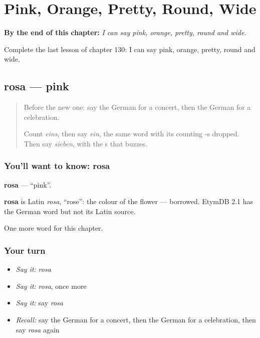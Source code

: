 
\chapter{Pink, Orange, Pretty, Round, Wide}
\label{ch:ge-pink-orange-pretty-round-wide}

\begin{chapteropening}
\textbf{By the end of this chapter:} \emph{I can say pink, orange, pretty, round and wide.}

Complete the last lesson of chapter 130: I can say pink, orange, pretty, round and wide.
\end{chapteropening}

\section[rosa]{rosa — pink}

\label{lesson:GE-C130-rosa}



\begin{quote}
Before the new one: say the German for a concert, then the German for a celebration.

Count \emph{eins}, then say \emph{ein}, the same word with its counting -s dropped. Then say \emph{sieben}, with the s that buzzes.
\end{quote}

\subsection*{You'll want to know: rosa}
\textbf{rosa} — \textquotedblleft{}pink\textquotedblright{}.

\begin{cousinweb}
\textbf{rosa} is Latin \emph{rosa}, \textquotedblleft{}rose\textquotedblright{}: the colour of the flower — borrowed. EtymDB 2.1 has the German word but not its Latin source.
\end{cousinweb}

\begin{grammarlens}[title={What you've built}]
One more word for this chapter.
\end{grammarlens}

\subsection*{Your turn}
\begin{itemize}
\raggedright
  \item \emph{Say it:} \emph{rosa}
  \item \emph{Say it:} \emph{rosa}, once more
  \item \emph{Say it:} say \emph{rosa}
  \item \emph{Recall:} say the German for a concert, then the German for a celebration, then say \emph{rosa} again
\end{itemize}

